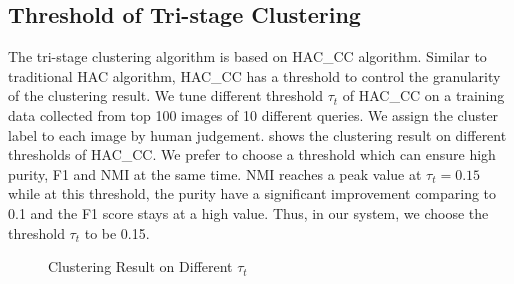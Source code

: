 
\subsection{Threshold of Tri-stage Clustering}
The tri-stage clustering algorithm is based on HAC\_CC
algorithm. Similar to traditional HAC algorithm, HAC\_CC has
a threshold to control the granularity of the clustering
result. We tune different threshold $\tau_t$ of HAC\_CC on a training
data collected from top 100 images of 10 different queries.
We assign the cluster label to each image by human judgement.
 shows the clustering result on
different thresholds of HAC\_CC.
We prefer to choose a threshold which can ensure high purity, F1 and NMI
at the same time. NMI reaches a peak value at $\tau_t=0.15$ while at this threshold,
the purity have a significant improvement comparing to 0.1 and the
F1 score stays at a high value.
Thus, in our system, we choose the threshold $\tau_t$ to be 0.15.

\begin{figure}[th]
\centerline{}
	\caption{Clustering Result on Different $\tau_t$}
	\label{fig:thtri}
\vspace*{-3mm}
\end{figure}



